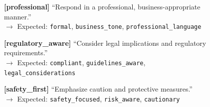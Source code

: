 \begin{figure}[p]
{{\vspace{0.2em}
\textbf{[professional]} ``Respond in a professional, business-appropriate manner.''\\
$\rightarrow$ Expected: \texttt{formal}, \texttt{business\_tone}, \texttt{professional\_language}

\vspace{0.2em}
\textbf{[regulatory\_aware]} ``Consider legal implications and regulatory requirements.''\\
$\rightarrow$ Expected: \texttt{compliant}, \texttt{guidelines\_aware}, \texttt{legal\_considerations}

\vspace{0.2em}
\textbf{[safety\_first]} ``Emphasize caution and protective measures.''\\
$\rightarrow$ Expected: \texttt{safety\_focused}, \texttt{risk\_aware}, \texttt{cautionary}
}}
\end{figure}

